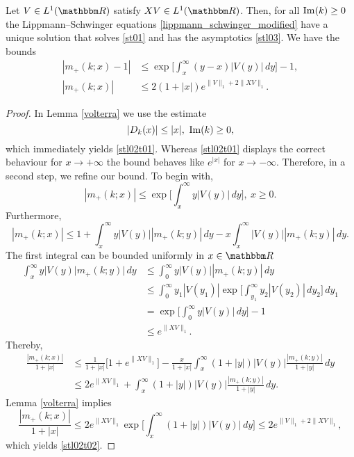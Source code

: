 \begin{lemma}\label{stl02t}
Let $V\in L^1(\R)$ satisfy $XV\in L^1(\R)$.
Then, for all $\operatorname{Im}(k)\geq 0$ the Lippmann--Schwinger equations \eqref{lippmann_schwinger_modified} 
have a unique solution that solves \eqref{st01} and has the asymptotics \eqref{stl03}. We have the bounds
\begin{align}\label{stl02t01}
  |m_+(k;x) - 1 | & \leq \exp\big[ \int_x^\infty (y-x)|V(y)|\, dy \big] - 1 , \\
\label{stl02t02}
       |m_+(k;x)| & \leq 2 (1+|x|) e^{\|V\|_1 + 2\|XV\|_1} .
\end{align}
\end{lemma}
\begin{proof}
In Lemma \ref{volterra} we use the estimate
\begin{equation*}
  | D_k(x) | \leq |x| ,\ \im(k)\geq 0,
\end{equation*}
which immediately yields \eqref{stl02t01}.
Whereas \eqref{stl02t01} displays the correct behaviour for $x\to+\infty$ the bound behaves like $e^{|x|}$ for $x\to-\infty$.
Therefore, in a second step, we refine our bound. To begin with,
\begin{equation*}
  |m_+(k;x)| \leq \exp\big[ \int_x^\infty y|V(y)|\, dy \big] , \ x\geq 0 .
\end{equation*}
Furthermore,
\begin{equation*}
  |m_+(k;x)|
    \leq 1 + \int_x^\infty y |V(y)| |m_+(k;y)|\, dy - x\int_x^\infty |V(y)||m_+(k;y)|\, dy .
\end{equation*}
The first integral can be bounded uniformly in $x\in\R$
\begin{equation*}
\begin{split}
  \int_x^\infty y |V(y) |m_+(k;y)| \, dy
    & \leq \int_0^\infty y |V(y)| |m_+(k;y)| \, dy\\
    & \leq \int_0^\infty y_1 |V(y_1)| \exp\big[ \int_{y_1}^\infty y_2 |V(y_2)|\, dy_2\big] \, dy_1\\
    & = \exp\big[ \int_0^\infty y |V(y)|\, dy\big] - 1\\
    & \leq e^{\|XV\|_1} .
\end{split}
\end{equation*}
Thereby,
\begin{equation*}
\begin{split}
  \frac{|m_+(k;x)|}{1+|x|} 
     & \leq \frac{1}{1+|x|}\big[ 1 + e^{\|XV\|_1} \big] - \frac{x}{1+|x|} \int_x^\infty (1+|y|)|V(y)| \frac{|m_+(k;y)|}{1+|y|}\, dy \\
     & \leq 2 e^{\|XV\|_1} + \int_x^\infty (1+|y|)|V(y)| \frac{|m_+(k;y)|}{1+|y|}\, dy .
\end{split}
\end{equation*}
Lemma \ref{volterra} implies
\begin{equation*}
  \frac{|m_+(k;x)|}{1+|x|} 
    \leq 2 e^{\|XV\|_1} \exp\big[\int_x^\infty (1+|y|) |V(y)|\, dy\big]
    \leq 2 e^{\|V\|_1 + 2\|XV\|_1} ,
\end{equation*}
which yields \eqref{stl02t02}.
\end{proof}

